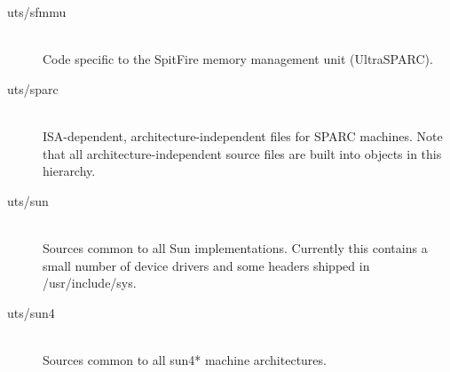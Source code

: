 \documentclass{article}
\begin{document}
\begin{description}
\item[uts/sfmmu] \hfill \\
  Code specific to the SpitFire memory management unit (UltraSPARC).

\item[uts/sparc] \hfill \\
  ISA-dependent, architecture-independent files for SPARC machines. Note that
  all architecture-independent source files are built into objects in this
  hierarchy.

\item[uts/sun] \hfill \\
  Sources common to all Sun implementations. Currently this contains a small
  number of device drivers and some headers shipped in /usr\-/incl\-ude\-/sys.

\item[uts/sun4] \hfill \\
  Sources common to all sun4* machine architectures.


\end{description}
\end{document}
